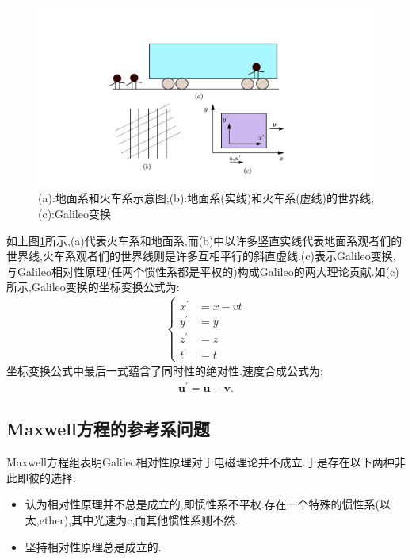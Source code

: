 \begin{figure}[htbp]
    \centering
 \includegraphics[width=1.2\textwidth]{img/6-2.png}
    \caption{(a):地面系和火车系示意图;(b):地面系(实线)和火车系(虚线)的世界线;(c):Galileo变换}
    \label{fig:6-2}
\end{figure}

如上图\ref{fig:6-2}所示,(a)代表火车系和地面系,而(b)中以许多竖直实线代表地面系观者们的世界线,火车系观者们的世界线则是许多互相平行的斜直虚线.(c)表示Galileo变换,与Galileo相对性原理(任两个惯性系都是平权的)构成Galileo的两大理论贡献.如(c)所示,Galileo变换的坐标变换公式为:
\begin{align}
    \left\{
    \begin{aligned}
        x^\prime&=x-vt\\
        y^\prime&=y\\
        z^\prime&=z\\
        t^\prime&=t
    \end{aligned}
    \right.
\end{align}
坐标变换公式中最后一式蕴含了同时性的绝对性.速度合成公式为:
\begin{align}
    \boldsymbol{u}^\prime=\boldsymbol{u}-\boldsymbol{v}.
\end{align}
\subsection{Maxwell方程的参考系问题}
Maxwell方程组表明Galileo相对性原理对于电磁理论并不成立.于是存在以下两种非此即彼的选择:
\begin{itemize}
\item 认为相对性原理并不总是成立的,即惯性系不平权.存在一个特殊的惯性系(以太,ether),其中光速为c,而其他惯性系则不然.
\item 坚持相对性原理总是成立的.
\end{itemize}

